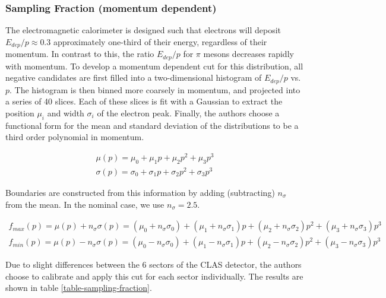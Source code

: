 \subsubsection*{Sampling Fraction (momentum dependent)}
The electromagnetic calorimeter is designed such that electrons will deposit $E_{dep}/p \approx 0.3$ approximately one-third of their energy, regardless of their momentum.  In contrast to this, the ratio $E_{dep}/p$ for $\pi$ mesons decreases rapidly with momentum.  To develop a momentum dependent cut for this distribution, all negative candidates are first filled into a two-dimensional histogram of $E_{dep}/p$ vs. $p$.  The histogram is then binned more coarsely in momentum, and projected into a series of 40 slices.  Each of these slices is fit with a Gaussian to extract the position $\mu_i$ and width $\sigma_i$ of the electron peak.  Finally, the authors choose a functional form for the mean and standard deviation of the distributions to be a third order polynomial in momentum.

\begin{eqnarray}
  \mu (p) = \mu_0 + \mu_1 p + \mu_2 p^2 + \mu_3 p^3 \\
  \sigma (p) = \sigma_0 + \sigma_1 p + \sigma_2 p^2 + \sigma_3 p^3 
\end{eqnarray}    

Boundaries are constructed from this information by adding (subtracting) $n_{\sigma}$ from the mean.  In the nominal case, we use $n_{\sigma} = 2.5$.

\begin{eqnarray}
  f_{max} (p) = \mu (p) + n_{\sigma} \sigma (p) = (\mu_0 + n_{\sigma} \sigma_0) + (\mu_1 + n_{\sigma} \sigma_1)p + (\mu_2 + n_{\sigma} \sigma_2)p^2 + (\mu_3 + n_{\sigma} \sigma_3)p^3 \\
  f_{min} (p) = \mu (p) - n_{\sigma} \sigma (p) = (\mu_0 - n_{\sigma} \sigma_0) + (\mu_1 - n_{\sigma} \sigma_1)p + (\mu_2 - n_{\sigma} \sigma_2)p^2 + (\mu_3 - n_{\sigma} \sigma_3)p^3
\end{eqnarray}

Due to slight differences between the 6 sectors of the CLAS detector, the authors choose to calibrate and apply this cut for each sector individually.  The results are shown in table \ref{table-sampling-fraction}.




